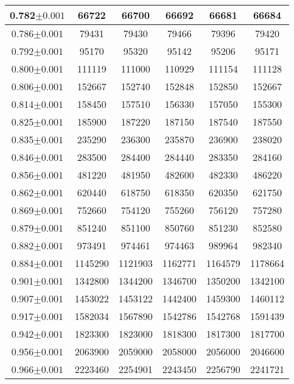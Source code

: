 \documentclass[a4paper]{article}
\theoremstyle{definition}
\begin{document}
\begin{table}[!htbp]
\begin{tabular}{c|ccccc}
        \hline
        0.782\( \pm 0.001\) & 66722& 66700& 66692& 66681& 66684\\
        \hline
        0.786\( \pm 0.001\) & 79431&  79430& 79466& 79396& 79420\\
        \hline
        0.792\( \pm 0.001\) & 95170& 95320& 95142& 95206& 95171\\
        \hline
        0.800\( \pm 0.001\) & 111119& 111000& 110929& 111154& 111128\\
        \hline
        0.806\( \pm 0.001\) & 152667& 152740& 152848& 152850& 152667\\
        \hline
        0.814\( \pm 0.001\) & 158450& 157510& 156330& 157050& 155300\\
        \hline
        0.825\( \pm 0.001\) & 185900& 187220& 187150& 187540& 187550\\
        \hline
        0.835\( \pm 0.001\) & 235290& 236300& 235870& 236900& 238020\\
        \hline
        0.846\( \pm 0.001\) & 283500& 284400& 284440& 283350& 284160\\
        \hline
        0.856\( \pm 0.001\) & 481220& 481950& 482600& 482330& 486220\\
        \hline
        0.862\( \pm 0.001\) & 620440& 618750& 618350& 620350& 621750\\
        \hline
        0.869\( \pm 0.001\) & 752660& 754120& 755260& 756120& 757280\\
        \hline
        0.879\( \pm 0.001\) & 851240& 851100& 850760& 851230& 852580\\
        \hline
        0.882\( \pm 0.001\) & 973491& 974461& 974463& 989964& 982340\\
        \hline
        0.884\( \pm 0.001\) & 1145290& 1121903& 1162771& 1164579& 1178664\\
        \hline
        0.901\( \pm 0.001\) & 1342800& 1344200& 1346700& 1350200& 1342100\\
        \hline
        0.907\( \pm 0.001\) & 1453022& 1453122& 1442400& 1459300& 1460112\\
        \hline
        0.917\( \pm 0.001\) & 1582034& 1567890& 1542786& 1542768& 1591439\\
        \hline
        0.942\( \pm 0.001\) & 1823300& 1823000& 1818300& 1817300& 1817700\\
        \hline
        0.956\( \pm 0.001\) & 2063900& 2059000& 2058000& 2056000& 2046600\\
        \hline
        0.966\( \pm 0.001\) & 2223460& 2254901& 2243450& 2256790& 2241721\\
        \hline
        \hline
    \end{tabular}

\end{table}
\end{document}

